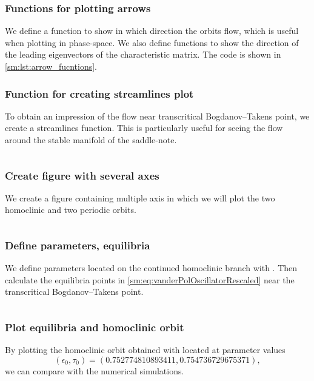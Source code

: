 \subsubsection{Functions for plotting arrows}
We define a function to show in which direction the orbits flow, which is
useful when plotting in phase-space. We also define functions to show the
direction of the leading eigenvectors of the characteristic matrix.
The code is shown in \cref{sm:lst:arrow_fucntions}.

\subsubsection{Function for creating streamlines plot}
To obtain an impression of the flow near transcritical Bogdanov--Takens point,
we create a streamlines function. This is particularly useful for seeing the
flow around the stable manifold of the saddle-note.
\inputminted[firstline=65, lastline=77]{julia}{\pathToJuliaFiles/vdpo_simulation_article.jl}

\subsubsection{Create figure with several axes}
We create a figure containing multiple axis in which we will plot 
the two homoclinic and two periodic orbits.
\inputminted[firstline=79, lastline=84]{julia}{\pathToJuliaFiles/vdpo_simulation_article.jl}

\subsubsection{Define parameters, equilibria}
We define parameters located on the continued homoclinic branch with
\DDEBIFTOOL. Then calculate the equilibria points in
\cref{sm:eq:vanderPolOscillatorRescaled} near the transcritical
Bogdanov--Takens point.
\inputminted[firstline=86, lastline=93]{julia}{\pathToJuliaFiles/vdpo_simulation_article.jl}

\subsubsection{Plot equilibria and homoclinic orbit}
By plotting the homoclinic orbit obtained with \DDEBIFTOOL located at parameter
values 
\[
    (\epsilon_0, \tau_0) = (0.752774810893411, 0.754736729675371),
\]
we can compare with the numerical simulations.
\inputminted[firstline=95, lastline=101]{julia}{\pathToJuliaFiles/vdpo_simulation_article.jl}

